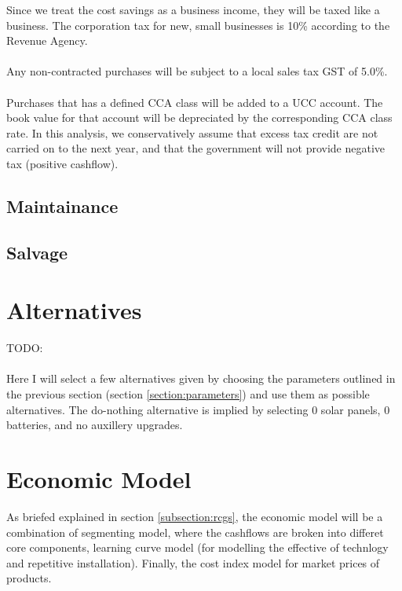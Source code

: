 \documentclass[10pt,letterpaper]{article}
\begin{document}
Since we treat the cost savings as a business income, they will be taxed like a business. The corporation tax for new, small businesses is 10\% according to the Revenue Agency\cite{business-tax}.\\
\\
Any non-contracted purchases will be subject to a local sales tax GST of 5.0\%.\\
\\
Purchases that has a defined CCA class will be added to a UCC account. The book value for that account will be depreciated by the corresponding CCA class rate. In this analysis, we conservatively assume that excess tax credit are not carried on to the next year, and that the government will not provide negative tax (positive cashflow).\\

\subsection{Maintainance}

\subsection{Salvage}

\section{Alternatives}\label{section:alternatives}

TODO:\\
\\
Here I will select a few alternatives given by choosing the parameters outlined in the previous section (section \ref{section:parameters}) and use them as possible alternatives. The do-nothing alternative is implied by selecting 0 solar panels, 0 batteries, and no auxillery upgrades.\\

\section{Economic Model}
As briefed explained in section \ref{subsection:rcgs}, the economic model will be a combination of segmenting model, where the cashflows are broken into differet core components, learning curve model (for modelling the effective of technlogy and repetitive installation). Finally, the cost index model for market prices of products.\\
\end{document}
